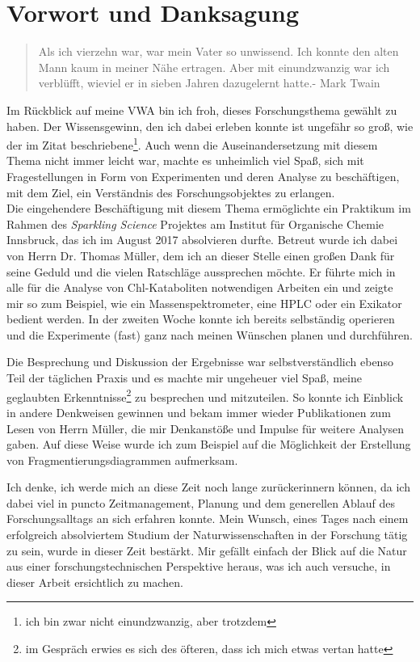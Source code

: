 \chapter*{Vorwort und Danksagung}
\label{cha:Vorwort}

\begin{quotation}
\glqq Als ich vierzehn war, war mein Vater so unwissend. Ich konnte den alten Mann kaum in meiner Nähe ertragen. Aber mit einundzwanzig war ich verblüfft, wieviel er in sieben Jahren dazugelernt hatte.\grqq - Mark Twain
\end{quotation}

Im Rückblick auf meine VWA bin ich froh, dieses Forschungsthema gewählt zu haben. Der Wissensgewinn, den ich dabei erleben konnte ist ungefähr so groß, wie der im Zitat beschriebene\footnote{ich bin zwar nicht einundzwanzig, aber trotzdem}. Auch wenn die Auseinandersetzung mit diesem Thema nicht immer leicht war, machte es unheimlich viel Spaß, sich mit Fragestellungen in Form von Experimenten und deren Analyse zu beschäftigen, mit dem Ziel, ein Verständnis des Forschungsobjektes zu erlangen.\\

Die eingehendere Beschäftigung mit diesem Thema ermöglichte ein Praktikum im Rahmen des \textit{Sparkling Science} Projektes am Institut für Organische Chemie Innsbruck, das ich im August 2017 absolvieren durfte. Betreut wurde ich dabei von Herrn Dr. Thomas Müller, dem ich an dieser Stelle einen großen Dank für seine Geduld und die vielen Ratschläge aussprechen möchte. Er führte mich in alle für die Analyse von Chl-Kataboliten notwendigen Arbeiten ein und zeigte mir so zum Beispiel, wie ein Massenspektrometer, eine HPLC oder ein Exikator bedient werden. In der zweiten Woche konnte ich bereits selbständig operieren und die Experimente (fast) ganz nach meinen Wünschen planen und durchführen. 

Die Besprechung und Diskussion der Ergebnisse war selbstverständlich ebenso Teil der täglichen Praxis und es machte mir ungeheuer viel Spaß, meine geglaubten Erkenntnisse\footnote{im Gespräch erwies es sich des öfteren, dass ich mich etwas vertan hatte} zu besprechen und mitzuteilen. So konnte ich Einblick in andere Denkweisen gewinnen und bekam immer wieder Publikationen zum Lesen von Herrn Müller, die mir Denkanstöße und Impulse für weitere Analysen gaben. Auf diese Weise wurde ich zum Beispiel auf die Möglichkeit der Erstellung von Fragmentierungsdiagrammen aufmerksam. 

Ich denke, ich werde mich an diese Zeit noch lange zurückerinnern können, da ich dabei viel in puncto Zeitmanagement, Planung und dem generellen Ablauf des Forschungsalltags an sich erfahren konnte. Mein Wunsch, eines Tages nach einem erfolgreich absolviertem Studium der Naturwissenschaften in der Forschung tätig zu sein, wurde in dieser Zeit bestärkt. Mir gefällt einfach der Blick auf die Natur aus einer forschungstechnischen Perspektive heraus, was ich auch versuche, in dieser Arbeit ersichtlich zu machen.\\


